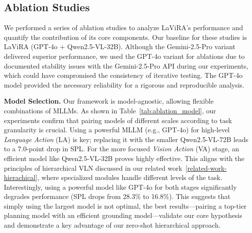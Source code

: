 \documentclass[letterpaper, 10 pt, conference]{ieeeconf}
\begin{document}
\subsection{Ablation Studies}
We performed a series of ablation studies to analyze LaViRA's performance and quantify the contribution of its core components. Our baseline for these studies is LaViRA (GPT-4o + Qwen2.5-VL-32B). Although the Gemini-2.5-Pro variant delivered superior performance, we used the GPT-4o variant for ablations due to documented stability issues with the Gemini-2.5-Pro API during our experiments, which could have compromised the consistency of iterative testing. The GPT-4o model provided the necessary reliability for a rigorous and reproducible analysis.

\noindent\textbf{Model Selection.}
\label{model-sec}
Our framework is model-agnostic, allowing flexible combinations of MLLMs. As shown in Table~\ref{tab:ablation_model}, our experiments confirm that pairing models of different scales according to task granularity is crucial. Using a powerful MLLM (e.g., GPT-4o) for high-level \textit{Language Action} (LA) is key; replacing it with the smaller Qwen2.5-VL-72B leads to a 7.0-point drop in SPL. For the more focused \textit{Vision Action} (VA) stage, an efficient model like Qwen2.5-VL-32B proves highly effective. This aligns with the principles of hierarchical VLN discussed in our related work~\ref{related-work-hierachical}, where specialized modules handle different levels of the task. 
Interestingly, using a powerful model like GPT-4o for both stages significantly degrades performance (SPL drops from 28.3\% to 16.8\%). This suggests that simply using the largest model is not optimal, the best results—pairing a top-tier planning model with an efficient grounding model—validate our core hypothesis and demonstrate a key advantage of our zero-shot hierarchical approach.
\end{document}

